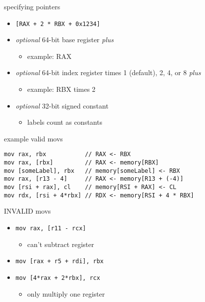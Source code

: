 \begin{frame}[fragile,label=specPtrs]{specifying pointers}
\begin{itemize}
\item \lstinline|[RAX + 2 * RBX + 0x1234]| 
\item \textit{optional} 64-bit base register \textit{plus}
    \begin{itemize}
    \item example: RAX
    \end{itemize}
\item \textit{optional} 64-bit index register times 1 (default), 2, 4, or 8 \textit{plus}
    \begin{itemize}
    \item example: RBX times 2
    \end{itemize}
\item \textit{optional} 32-bit signed constant
    \begin{itemize}
    \item labels count as constants
    \end{itemize}
\end{itemize}
\end{frame}

\begin{frame}[fragile,label=validMovs]{example valid movs}
\lstset{language=myasm,deletekeywords=cl}
\begin{lstlisting}
mov rax, rbx           // RAX <- RBX
mov rax, [rbx]         // RAX <- memory[RBX]
mov [someLabel], rbx   // memory[someLabel] <- RBX
mov rax, [r13 - 4]     // RAX <- memory[R13 + (-4)]
mov [rsi + rax], cl    // memory[RSI + RAX] <- CL
mov rdx, [rsi + 4*rbx] // RDX <- memory[RSI + 4 * RBX]
\end{lstlisting}
\end{frame}

\begin{frame}[fragile,label=invalidMovs]{INVALID movs}
\lstset{language=myasm}
\begin{itemize}
\item{} \lstinline|mov rax, [r11 - rcx]|
    \begin{itemize}
    \item can't subtract register
    \end{itemize}
\item{} \lstinline|mov [rax + r5 + rdi], rbx|
\item{} \lstinline|mov [4*rax + 2*rbx], rcx| 
    \begin{itemize}
    \item only multiply one register
    \end{itemize}
\end{itemize}
\end{frame}

